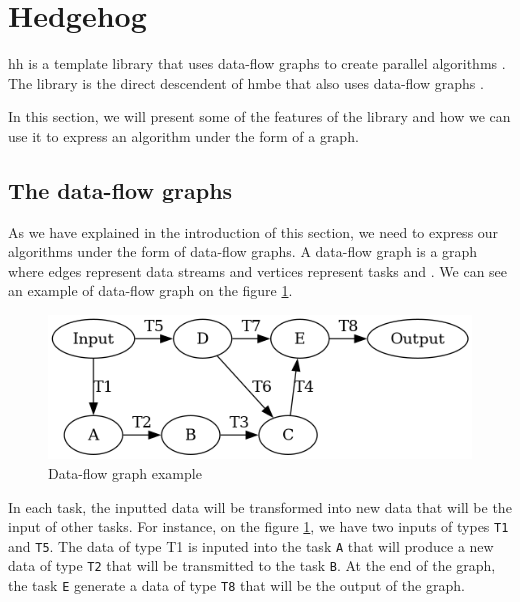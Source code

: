 
\section{Hedgehog}
\label{sec:hh}

\gls{hh} is a template library that uses data-flow graphs to create
parallel algorithms \cite{bardakoff2021analysis}. The library is the direct
descendent of \gls{hmbe} that also uses data-flow graphs
\cite{blattner2017model}.

In this section, we will present some of the features of the library and how
we can use it to express an algorithm under the form of a graph.

\subsection{The data-flow graphs}

As we have explained in the introduction of this section, we need to express our
algorithms under the form of data-flow graphs. A data-flow graph is a graph
where edges represent data streams and vertices represent tasks
\cite{kavi1986formal} and \cite{bardakoff2021analysis}. We can see an example of
data-flow graph on the figure \ref{fig:data-flow-graph-example}.

\begin{figure}[h!]
  \begin{center}
    \includegraphics[scale=0.5]{./img/data-flow-graph-example.png}
    \caption{Data-flow graph example}
    \label{fig:data-flow-graph-example}
  \end{center}
\end{figure}

In each task, the inputted data will be transformed into new data that will be
the input of other tasks. For instance, on the figure
\ref{fig:data-flow-graph-example}, we have two inputs of types \texttt{T1} and
\texttt{T5}. The data of type T1 is inputed into the task \texttt{A} that will
produce a new data of type \texttt{T2} that will be transmitted to the task
\texttt{B}. At the end of the graph, the task \texttt{E} generate a data of type
\texttt{T8} that will be the output of the graph.

